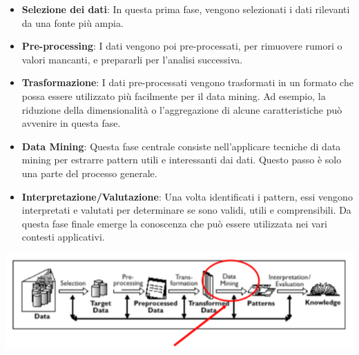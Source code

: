 \documentclass{report}
\begin{document}
	\begin{itemize}
    	\item \textbf{Selezione dei dati}: In questa prima fase, vengono selezionati i dati 	rilevanti da una fonte più ampia.
    	\item \textbf{Pre-processing}: I dati vengono poi pre-processati, per rimuovere rumori o valori mancanti, e prepararli per l'analisi successiva.
    	\item \textbf{Trasformazione}: I dati pre-processati vengono trasformati in un formato che possa essere utilizzato più facilmente per il data mining. Ad esempio, la riduzione della dimensionalità o l'aggregazione di alcune caratteristiche può avvenire in questa fase.
    	\item \textbf{Data Mining}: Questa fase centrale consiste nell'applicare tecniche di data mining per estrarre pattern utili e interessanti dai dati. Questo passo è solo una parte del processo generale.
   		\item \textbf{Interpretazione/Valutazione}: Una volta identificati i pattern, essi vengono interpretati e valutati per determinare se sono validi, utili e comprensibili. Da questa fase finale emerge la conoscenza che può essere utilizzata nei vari contesti applicativi.
	\end{itemize}
	\begin{center}
		\includegraphics[scale=0.6]{assets/kdd.png}
	\end{center}
\end{document}
